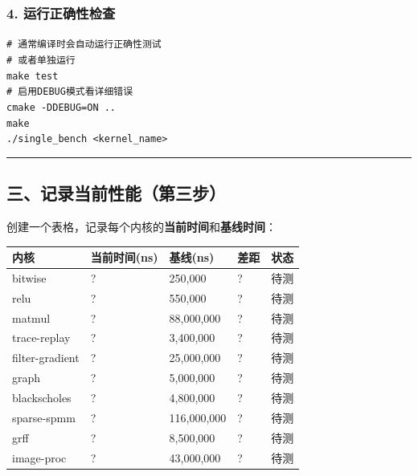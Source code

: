 \documentclass[11pt, a4paper]{article}
\begin{document}
\begin{aibox}
\subsubsection*{4. 运行正确性检查}
\begin{tcolorbox}[colback=white,colframe=gray!50!white,boxrule=0.5pt,arc=2pt,left=5pt,right=5pt,top=5pt,bottom=5pt]
\texttt{\# 通常编译时会自动运行正确性测试}\\
\texttt{\# 或者单独运行}\\
\texttt{make test}\\[0.5em]
\texttt{\# 启用DEBUG模式看详细错误}\\
\texttt{cmake -DDEBUG=ON ..}\\
\texttt{make}\\
\texttt{./single\_bench \textless kernel\_name\textgreater }
\end{tcolorbox}

\begin{center}\rule{\textwidth}{0.4pt}\end{center}

\subsection*{三、记录当前性能（第三步）}

创建一个表格，记录每个内核的\textbf{当前时间}和\textbf{基线时间}：

\vspace{0.5em}
\begin{tabularx}{\textwidth}{@{} l l l l X @{}}
\toprule
内核 & 当前时间(ns) & 基线(ns) & 差距 & 状态 \\
\midrule
bitwise & ? & 250,000 & ? & 待测 \\
relu & ? & 550,000 & ? & 待测 \\
matmul & ? & 88,000,000 & ? & 待测 \\
trace-replay & ? & 3,400,000 & ? & 待测 \\
filter-gradient & ? & 25,000,000 & ? & 待测 \\
graph & ? & 5,000,000 & ? & 待测 \\
blackscholes & ? & 4,800,000 & ? & 待测 \\
sparse-spmm & ? & 116,000,000 & ? & 待测 \\
grff & ? & 8,500,000 & ? & 待测 \\
image-proc & ? & 43,000,000 & ? & 待测 \\
\bottomrule
\end{tabularx}
\vspace{0.5em}


\end{aibox}
\end{document}
